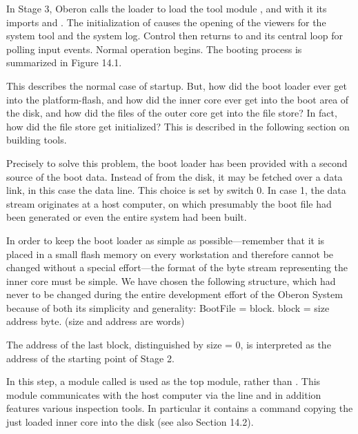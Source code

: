 In Stage 3, Oberon calls the loader to load the tool module , and with it its imports  and . The initialization of  causes the opening of the viewers for the system tool and the system log. Control then returns to  and its central loop for polling input events. Normal operation begins. The booting process is summarized in Figure 14.1.


This describes the normal case of startup. But, how did the boot loader ever get into the platform-flash, and how did the inner core ever get into the boot area of the disk, and how did the files of the outer core get into the file store? In fact, how did the file store get initialized? This is described in the following section on building tools.

Precisely to solve this problem, the boot loader has been provided with a second source of the boot data. Instead of from the disk, it may be fetched over a data link, in this case the  data line. This choice is set by switch 0.
In case 1, the data stream originates at a host computer, on which presumably the boot file had been generated or even the entire system had been built.

In order to keep the boot loader as simple as possible---remember that it is placed in a small flash memory on every workstation and therefore cannot be changed without a special effort---the format of the byte stream representing the inner core must be simple. We have chosen the following structure, which had never to be changed during the entire development effort of the Oberon System because of both its simplicity and generality:
\begintt
BootFile = {block}.
block = size address {byte}. (size and address are words)
\endtt

The address of the last block, distinguished by size = 0, is interpreted as the address of the starting point of Stage 2.

In this step, a module called  is used as the top module, rather than . This module communicates with the host computer via the  line and in addition features various inspection tools. In particular it contains a command copying the just loaded inner core into the disk (see also Section 14.2).

